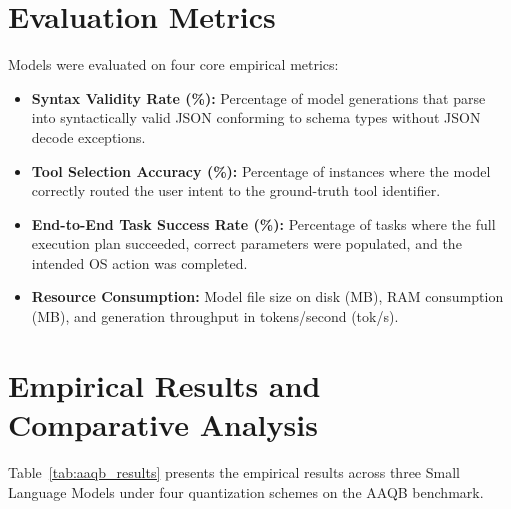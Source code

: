 \documentclass[12pt,a4paper,oneside]{report}
\begin{document}
\section{Evaluation Metrics}
Models were evaluated on four core empirical metrics:
\begin{itemize}
    \item \textbf{Syntax Validity Rate (\%):} Percentage of model generations that parse into syntactically valid JSON conforming to schema types without JSON decode exceptions.
    \item \textbf{Tool Selection Accuracy (\%):} Percentage of instances where the model correctly routed the user intent to the ground-truth tool identifier.
    \item \textbf{End-to-End Task Success Rate (\%):} Percentage of tasks where the full execution plan succeeded, correct parameters were populated, and the intended OS action was completed.
    \item \textbf{Resource Consumption:} Model file size on disk (MB), RAM consumption (MB), and generation throughput in tokens/second (tok/s).
\end{itemize}

\section{Empirical Results and Comparative Analysis}
Table~\ref{tab:aaqb_results} presents the empirical results across three Small Language Models under four quantization schemes on the AAQB benchmark.
\end{document}
